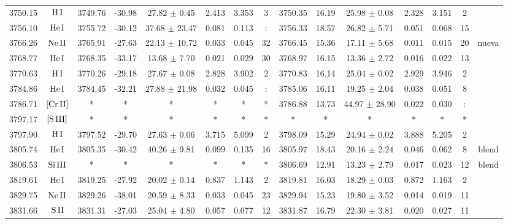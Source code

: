 \documentclass{article}
\begin{document}
\begin{table*}
\begin{adjustbox}{width=\textwidth}
\begin{tabular}{ccccccccccccccc}
3750.15 & $\mbox{H}\thinspace \mbox{I}$ & 3749.76 & -30.98 & 27.82 $\pm$ 0.45 & 2.413 & 3.353 & 3 & 3750.35 & 16.19 & 25.98 $\pm$ 0.08 & 2.328 & 3.151 & 2 &  \\
3756.10 & $\mbox{He}\thinspace \mbox{I}$ & 3755.72 & -30.12 & 37.68 $\pm$ 23.47 & 0.081 & 0.113 & : & 3756.33 & 18.57 & 26.82 $\pm$ 5.71 & 0.051 & 0.068 & 15 &  \\
3766.26 & $\mbox{Ne}\thinspace \mbox{II}$ & 3765.91 & -27.63 & 22.13 $\pm$ 10.72 & 0.033 & 0.045 & 32 & 3766.45 & 15.36 & 17.11 $\pm$ 5.68 & 0.011 & 0.015 & 20 &  nueva \\
3768.77 & $\mbox{He}\thinspace \mbox{I}$ & 3768.35 & -33.17 & 13.68 $\pm$ 7.70 & 0.021 & 0.029 & 30 & 3768.97 & 16.15 & 13.36 $\pm$ 2.72 & 0.016 & 0.022 & 13 &  \\
3770.63 & $\mbox{H}\thinspace \mbox{I}$ & 3770.26 & -29.18 & 27.67 $\pm$ 0.08 & 2.828 & 3.902 & 2 & 3770.83 & 16.14 & 25.04 $\pm$ 0.02 & 2.929 & 3.946 & 2 &  \\
3784.86 & $\mbox{He}\thinspace \mbox{I}$ & 3784.45 & -32.21 & 27.88 $\pm$ 21.98 & 0.032 & 0.045 & : & 3785.06 & 16.11 & 19.25 $\pm$ 2.04 & 0.038 & 0.051 & 8 &  \\
3786.71 & $\mbox{[Cr}\thinspace \mbox{II]}$ & * & * & * & * & * & * & 3786.88 & 13.73 & 44.97 $\pm$ 28.90 & 0.022 & 0.030 & : &  \\
3797.17 & $\mbox{[S}\thinspace \mbox{III]}$ & * & * & * & * & * & * & * & * & * & * & * & * &  \\
3797.90 & $\mbox{H}\thinspace \mbox{I}$ & 3797.52 & -29.70 & 27.63 $\pm$ 0.06 & 3.715 & 5.099 & 2 & 3798.09 & 15.29 & 24.94 $\pm$ 0.02 & 3.888 & 5.205 & 2 &  \\
3805.74 & $\mbox{He}\thinspace \mbox{I}$ & 3805.35 & -30.42 & 40.26 $\pm$ 9.81 & 0.099 & 0.135 & 16 & 3805.97 & 18.43 & 20.16 $\pm$ 2.24 & 0.046 & 0.062 & 8 &  blend \\
3806.53 & $\mbox{Si}\thinspace \mbox{III}$ & * & * & * & * & * & * & 3806.69 & 12.91 & 13.23 $\pm$ 2.79 & 0.017 & 0.023 & 12 &  blend \\
3819.61 & $\mbox{He}\thinspace \mbox{I}$ & 3819.25 & -27.92 & 20.02 $\pm$ 0.14 & 0.837 & 1.143 & 2 & 3819.81 & 16.03 & 18.29 $\pm$ 0.03 & 0.872 & 1.163 & 2 &  \\
3829.75 & $\mbox{Ne}\thinspace \mbox{II}$ & 3829.26 & -38.01 & 20.59 $\pm$ 8.33 & 0.033 & 0.045 & 23 & 3829.94 & 15.23 & 19.80 $\pm$ 3.52 & 0.014 & 0.019 & 11 &  \\
3831.66 & $\mbox{S}\thinspace \mbox{II}$ & 3831.31 & -27.03 & 25.04 $\pm$ 4.80 & 0.057 & 0.077 & 12 & 3831.87 & 16.79 & 22.30 $\pm$ 3.81 & 0.020 & 0.027 & 11 &  \\

\end{tabular}
\end{adjustbox}
\end{table*}
\end{document}
